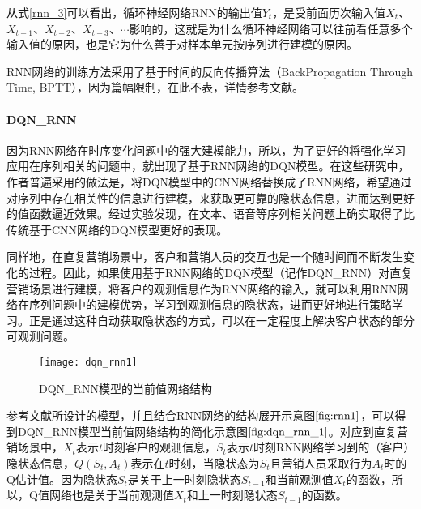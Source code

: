 从式\eqref{rnn_3}可以看出，循环神经网络RNN的输出值$Y_{t}$，是受前面历次输入值$X_{t}$、$X_{t-1}$、$X_{t-2}$、$X_{t-3}$、$\cdots$影响的，这就是为什么循环神经网络可以往前看任意多个输入值的原因，也是它为什么善于对样本单元按序列进行建模的原因。

RNN网络的训练方法采用了基于时间的反向传播算法（BackPropagation Through Time, BPTT），因为篇幅限制，在此不表，详情参考文献\citep{bersini1997simplification}。

 \paragraph{DQN_RNN}
 因为RNN网络在时序变化问题中的强大建模能力，所以，为了更好的将强化学习应用在序列相关的问题中，就出现了基于RNN网络的DQN模型\citep{hausknecht2015deep,narasimhan2015language}。在这些研究中，作者普遍采用的做法是，将DQN模型中的CNN网络替换成了RNN网络，希望通过对序列中存在相关性的信息进行建模，来获取更可靠的隐状态信息，进而达到更好的值函数逼近效果。经过实验发现，在文本、语音等序列相关问题上确实取得了比传统基于CNN网络的DQN模型更好的表现\citep{bakker2002reinforcement,hausknecht2015deep,lin1993reinforcement,narasimhan2015language}。

 同样地，在直复营销场景中，客户和营销人员的交互也是一个随时间而不断发生变化的过程。因此，如果使用基于RNN网络的DQN模型（记作DQN_RNN）对直复营销场景进行建模，将客户的观测信息作为RNN网络的输入，就可以利用RNN网络在序列问题中的建模优势，学习到观测信息的隐状态，进而更好地进行策略学习。正是通过这种自动获取隐状态的方式，可以在一定程度上解决客户状态的部分可观测问题。

  \begin{figure}[htbp]
 \centering
 \texttt{[image: dqn\_rnn1]}
 \caption{DQN_RNN模型的当前值网络结构}
 \label{fig:dqn_rnn_1}
 \end{figure}

 参考文献\citep{hausknecht2015deep,narasimhan2015language}所设计的模型，并且结合RNN网络的结构展开示意图$\ref{fig:rnn1}$，可以得到DQN_RNN模型当前值网络结构的简化示意图$\ref{fig:dqn_rnn_1}$。对应到直复营销场景中，$X_{t}$表示$t$时刻客户的观测信息，$S_{t}$表示$t$时刻RNN网络学习到的（客户）隐状态信息，$Q(S_{t}, A_{t})$表示在$t$时刻，当隐状态为$S_{t}$且营销人员采取行为$A_{t}$时的Q估计值。因为隐状态$S_{t}$是关于上一时刻隐状态$S_{t-1}$和当前观测值$X_{t}$的函数，所以，Q值网络也是关于当前观测值$X_{t}$和上一时刻隐状态$S_{t-1}$的函数。


